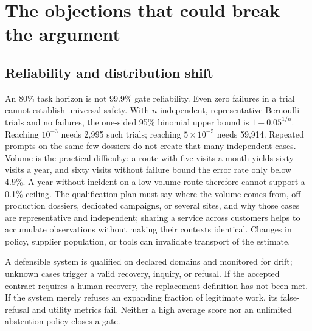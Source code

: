 \section{The objections that could break the argument}
\label{sec:objections}

\subsection{Reliability and distribution shift}

An 80\% task horizon is not 99.9\% gate reliability. Even zero failures in a trial cannot establish
universal safety. With $n$ independent, representative Bernoulli trials and no failures, the one-sided
95\% binomial upper bound is $1-0.05^{1/n}$. Reaching $10^{-3}$ needs 2,995 such trials; reaching
$5\times10^{-5}$ needs 59,914. Repeated prompts on the same few dossiers do not create that many
independent cases. Volume is the practical difficulty: a route with five visits a month yields sixty
visits a year, and sixty visits without failure bound the error rate only below 4.9\%. A year without
incident on a low-volume route therefore cannot support a 0.1\% ceiling. The qualification plan must
say where the volume comes from, off-production dossiers, dedicated campaigns, or several sites, and
why those cases are representative and independent; sharing a service across customers helps to
accumulate observations without making their contexts identical. Changes in policy, supplier population, or tools can invalidate transport of the
estimate.

A defensible system is qualified on declared domains and monitored for drift; unknown cases trigger a
valid recovery, inquiry, or refusal. If the accepted contract requires a human recovery, the
replacement definition has not been met. If the system merely refuses an expanding fraction of
legitimate work, its false-refusal and utility metrics fail. Neither a high average score nor an
unlimited abstention policy closes a gate.

